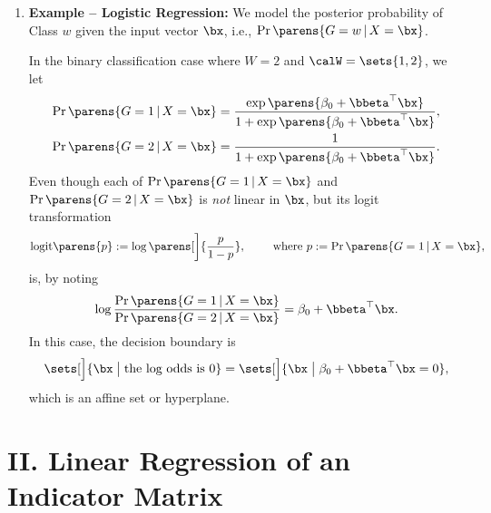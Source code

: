 \documentclass[12pt]{article}
\begin{document}
\begin{enumerate}[label=\textbf{\arabic*.}]
	\item \textbf{Example -- Logistic Regression:} We model the posterior probability of Class $w$ given the input vector $\bx$, i.e., $\Pr \parens{G = w \,\vert\, X = \bx}$. 
	
	In the binary classification case where $W = 2$ and $\calW = \sets{1, 2}$, we let 
	\begin{align*}
		\Pr \parens{G = 1 \,\vert\, X = \bx} = \frac{\exp \parens{\beta_0 + \bbeta^\top \bx}}{1 + \exp \parens{\beta_0 + \bbeta^\top \bx}}, \\
		\Pr \parens{G = 2 \,\vert\, X = \bx} = \frac{1}{1 + \exp \parens{\beta_0 + \bbeta^\top \bx}}. 
	\end{align*}
	Even though each of  $\Pr \parens{G = 1 \,\vert\, X = \bx}$ and $\Pr \parens{G = 2 \,\vert\, X = \bx}$ is \emph{not} linear in $\bx$, but its logit transformation 
	\begin{align*}
		\mathrm{logit} \parens{p} := \log \parens[\bigg]{\frac{p}{1 - p}}, \qquad \text{ where } p := \Pr \parens{G = 1 \,\vert\, X = \bx}, 
	\end{align*}
	is, by noting 
	\begin{align*}
		\log \frac{\Pr \parens{G = 1 \,\vert\, X = \bx}}{\Pr \parens{G = 2 \,\vert\, X = \bx}} = \beta_0 + \bbeta^\top \bx. 
	\end{align*}
	In this case, the decision boundary is
	\begin{align*}
		\sets[\Big]{ \bx \bigm| \text{the log odds is } 0 } = \sets[\Big]{ \bx \bigm| \beta_0 + \bbeta^\top \bx = 0 }, 
	\end{align*}
	which is an affine set or hyperplane. 
\end{enumerate}

\section*{II. Linear Regression of an Indicator Matrix} 
\end{document}
